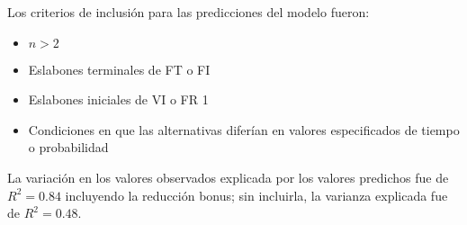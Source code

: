 \documentclass[a4paper,12pt]{article}
\begin{document}
Los criterios de inclusión para las predicciones del modelo fueron:
\begin{itemize}
    \item $n > 2$ 
    \item Eslabones terminales de FT o FI
    \item Eslabones iniciales de VI o FR 1
    \item Condiciones en que las alternativas diferían en valores especificados de tiempo o probabilidad
\end{itemize}

La variación en los valores observados explicada por los valores predichos fue de ${R^{2} = 0.84}$ incluyendo la reducción bonus; sin incluirla, la varianza explicada fue de $R^{2} = 0.48$.
\end{document}
